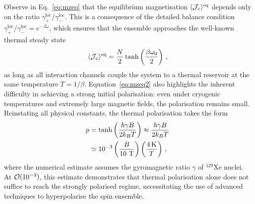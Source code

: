 \documentclass[aps,prd,10pt,twocolumn,superscriptaddress,floatfix,nofootinbib,amsmath,amssymb,altaffilletter,preprintnumbers]{revtex4-1}
\begin{document}
 
Observe in Eq.~\eqref{eq:mzeq} that the equilibrium magnetisation $\langle {\cal J}_z \rangle^{\text{eq}}$ depends only on the ratio $\gamma^{\text{loc}}_+ / \gamma^{\text{loc}}_-$.  This is a consequence of the detailed balance condition $\gamma^{\text{loc}}_+/\gamma^{\text{loc}}_- = e^{-\beta \omega}$, which ensures that the ensemble approaches the well-known thermal steady state
\begin{equation}
\langle {\cal J}_z \rangle^{\rm eq} = \frac{N}{2} \tanh\left(\frac{\beta \omega_0}{2}\right)\, ,
\label{eq:mzeq2}
\end{equation}
as long as all interaction channels couple the system to a thermal reservoir at the same temperature $T= 1/\beta$. 
Equation~\eqref{eq:mzeq2} also highlights the inherent difficulty in achieving a strong initial polarisation: even under cryogenic temperatures and extremely large magnetic fields, the polarisation remains small. Reinstating all physical constants, the thermal polarisation takes the form 
\begin{equation}
\begin{aligned}
    p&=\tanh\left(\frac{\hbar\gamma B}{2k_BT}\right)\approx \frac{\hbar\gamma B}{2k_BT}\\
    &\simeq 10^{-3}\left(\frac{B}{10~ {\rm T}}\right)\left(\frac{4\, {\rm K}}{T}\right)\, ,
    \label{eq:thermalpol}
\end{aligned}
\end{equation}
where the numerical estimate assumes the gyromagnetic ratio $\gamma$ of $^{129}$Xe nuclei. At ${\cal O}(10^{-3})$, this estimate demonstrates that thermal polarisation alone does not suffice to reach the strongly polarised regime, necessitating the use of advanced techniques to hyperpolarise the spin ensemble.
\end{document}
